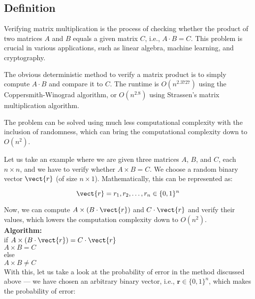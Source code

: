     \subsection*{Definition}
        Verifying matrix multiplication is the process of checking whether the product of two matrices \(A\) and \(B\) equals a given matrix \(C\), i.e., \(A \cdot B = C\). This problem is crucial in various applications, such as linear algebra, machine learning, and cryptography.

        The obvious deterministic method to verify a matrix product is to simply compute \(A \cdot B\) and compare it to \(C\). The runtime is \(O(n^{2.3727})\) using the Coppersmith-Winograd algorithm, or \(O(n^{2.8})\) using Strassen's matrix multiplication algorithm.

        The problem can be solved using much less computational complexity with the inclusion of randomness, which can bring the computational complexity down to \(O(n^2)\).

        Let us take an example where we are given three matrices \(A\), \(B\), and \(C\), each \(n \times n\), and we have to verify whether \(A \times B = C\). We choose a random binary vector \(\vect{r}\) (of size \(n \times 1\)). Mathematically, this can be represented as:

        \[
            \vect{r} = {r_1, r_2, \dots, r_n} \in \{0, 1\}^n
        \]

        Now, we can compute \(A \times (B \cdot \vect{r})\) and \(C \cdot \vect{r}\) and verify their values, which lowers the computation complexity down to \(O(n^2)\).\\

        \textbf{Algorithm:}\\
            \hspace*{10mm} if \(A \times (B \cdot \vect{r}) = C \cdot \vect{r}\)\\
            \hspace*{20mm} \(A \times B = C\)\\
            \hspace*{10mm} else\\
            \hspace*{20mm} \(A \times B \ne C\)\\
        
        With this, let us take a look at the probability of error in the method discussed above --- we have chosen an arbitrary binary vector, i.e., \(\mathbf{r} \in \{0, 1\}^n\), which makes the probability of error:

